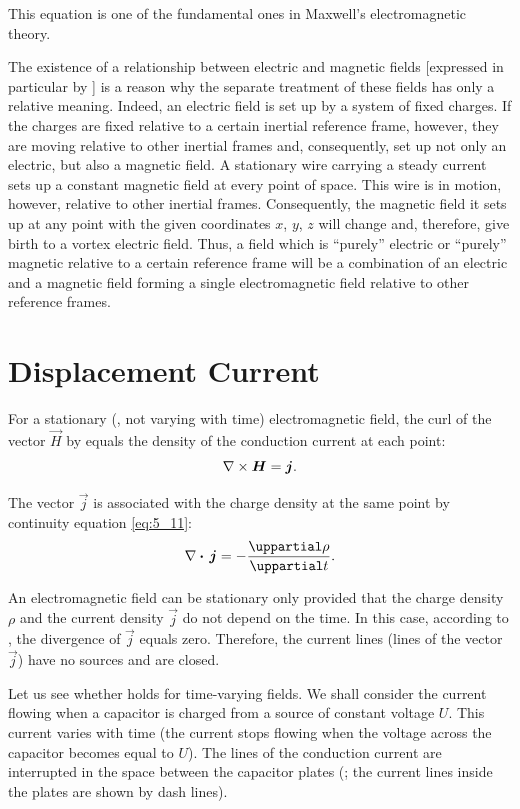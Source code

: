 \noindent
This equation is one of the fundamental ones in Maxwell's electromagnetic theory.

The existence of a relationship between electric and magnetic fields [expressed in particular by ] is a reason why the separate treatment of these fields has only a relative meaning.
Indeed, an electric field is set up by a system of fixed charges.
If the charges are fixed relative to a certain inertial reference frame, however, they are moving relative to other inertial frames and, consequently, set up not only an electric, but also a magnetic field.
A stationary wire carrying a steady current sets up a constant magnetic field at every point of space.
This wire is in motion, however, relative to other inertial frames.
Consequently, the magnetic field it sets up at any point with the given coordinates $x$, $y$, $z$ will change and, therefore, give birth to a vortex electric field.
Thus, a field which is ``purely'' electric or ``purely'' magnetic relative to a certain reference frame will be a combination of an electric and a magnetic field forming a single electromagnetic field relative to other reference frames.

\section{Displacement Current}\label{sec:9_2}

For a stationary (\ie, not varying with time) electromagnetic field, the curl of the vector $\vec{H}$ by  equals the density of the conduction current at each point:
\begin{equation*}
    \nabla\times\boldsymbol{H} = \boldsymbol{j}.
\end{equation*}

\noindent
The vector $\vec{j}$ is associated with the charge density at the same point by continuity equation \eqref{eq:5_11}:
\begin{equation*}
    \divop{\vec{j}} = - \diffpartial{\rho}{t}.
\end{equation*}

An electromagnetic field can be stationary only provided that the charge density $\rho$ and the current density $\vec{j}$ do not depend on the time.
In this case, according to , the divergence of $\vec{j}$ equals zero.
Therefore, the current lines (lines of the vector $\vec{j}$) have no sources and are closed.

Let us see whether  holds for time-varying fields.
We shall consider the current flowing when a capacitor is charged from a source of constant voltage $U$.
This current varies with time (the current stops flowing when the voltage across the capacitor becomes equal to $U$).
The lines of the conduction current are interrupted in the space between the capacitor plates (; the current lines inside the plates are shown by dash lines).

